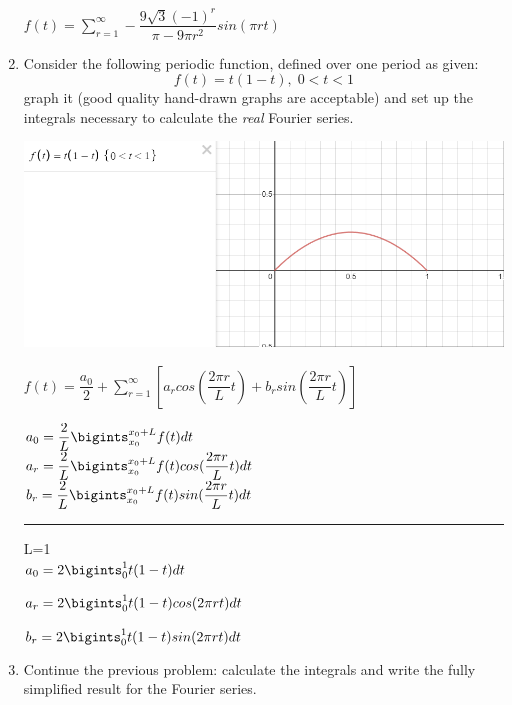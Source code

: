 \documentclass[fleqn]{article}
\begin{document}
\begin{enumerate}
    \bigbreak

    \textcolor{hwColor}{
      $f(t)=\sum\limits_{r=1}^{\infty} -\dfrac{9\sqrt{3}(-1)^r}{\pi - 9\pi r^2} sin(\pi rt)$
    }
  
  \item Consider the following periodic function, defined over one period as given: 
  $$
    f(t)=t(1-t) ,\;0<t<1
  $$
  graph it (good quality hand-drawn graphs are acceptable) and set up the integrals necessary to calculate the \emph{real} Fourier series.

    \includegraphics[width=\linewidth]{b.png}

    \textcolor{hwColor}{
      $f(t)=\dfrac{a_0}{2}+\sum\limits_{r=1}^{\infty}\left[a_r cos(\dfrac{2\pi r}{L}t)+b_r sin(\dfrac{2\pi r}{L}t)\right]$ 
    } 

    \textcolor{hwColor}{
      $a_0=\dfrac{2}{L}\bigints_{x_0}^{x_0+L}f(t)dt$ \\
      $a_r=\dfrac{2}{L}\bigints_{x_0}^{x_0+L}f(t) cos(\dfrac{2\pi r}{L}t)dt$ \\
      $b_r=\dfrac{2}{L}\bigints_{x_0}^{x_0+L}f(t) sin(\dfrac{2\pi r}{L}t)dt$ \\
    }

    \textcolor{hwColor}{ 
      \rule{15cm}{0.4pt}
    }

    \textcolor{hwColor}{ 
      L=1 \\ 
      $a_0=2\bigints_{0}^{1}t(1-t)dt$ \\
    }

    \textcolor{hwColor}{
      $a_r=2\bigints_{0}^{1}t(1-t) cos(2\pi rt)dt$ \\
    }

    \textcolor{hwColor}{
      $b_r=2\bigints_{0}^{1}t(1-t) sin(2\pi rt)dt$ \\
    }
  
  \item Continue the previous problem:  calculate the integrals and write the fully simplified result for the Fourier series. 
  

\end{enumerate}
\end{document}
